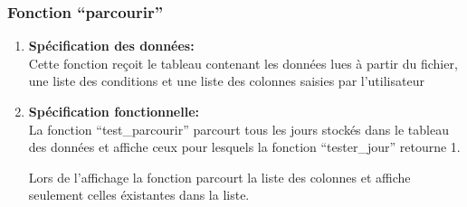  
  \subsubsection{Fonction ``parcourir''}
\begin{enumerate}[label=\textbf{\Alph* --}]
	\item \textbf{Spécification des données: \\}
		Cette fonction reçoit le tableau contenant les données lues à partir du fichier, une liste des
		conditions et une liste des colonnes saisies par l'utilisateur
    \item \textbf{Spécification fonctionnelle: \\}
    La fonction ``test\_parcourir'' parcourt tous les jours stockés dans le tableau des données et affiche 
    ceux pour lesquels la fonction ``tester\_jour'' retourne 1.
    
    Lors de l'affichage la fonction parcourt la liste des colonnes et affiche seulement celles éxistantes
    dans la liste.
 \end{enumerate}	
 
 

